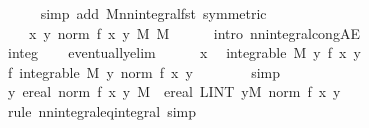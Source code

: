 \documentclass{article}
\theoremstyle{definition}
\begin{document}
\begin{figure}
\begin{isabellebody}
\ \ \ \ \isamarkupfalse%
\ {\isacharparenleft}simp\ add{\isacharcolon}\ M{}{\isachardot}nn{\isacharunderscore}integral{\isacharunderscore}fst\ {\isacharbrackleft}symmetric{\isacharbrackright}{\isacharparenright}\isanewline
\ \ \isamarkupfalse%
\ \isamarkupfalse%
\ {\isachardoublequoteopen}{\isasymdots}\ {\isacharequal}\ {\isacharparenleft}{\isasymintegral}\isactrlsup {\isacharplus}\ x{\isachardot}\ {\isasymbar}{\isasymintegral}y{\isachardot}\ norm\ {\isacharparenleft}f\ {\isacharparenleft}x{\isacharcomma}\ y{\isacharparenright}{\isacharparenright}\ {\isasympartial}M{}{\isasymbar}\ {\isasympartial}M{}{\isacharparenright}{\isachardoublequoteclose}\isanewline
\ \ \ \ \isamarkupfalse%
\ {\isacharparenleft}intro\ nn{\isacharunderscore}integral{\isacharunderscore}cong{\isacharunderscore}AE{\isacharparenright}\isanewline
\ \ \ \ \isamarkupfalse%
\ integ{}\isanewline
\ \ \isamarkupfalse%
\ eventually{\isacharunderscore}elim\isanewline
\ \ \ \ \isamarkupfalse%
\ x\ \isamarkupfalse%
\ {\isachardoublequoteopen}integrable\ M{}\ {\isacharparenleft}{\isasymlambda}y{\isachardot}\ f\ {\isacharparenleft}x{\isacharcomma}\ y{\isacharparenright}{\isacharparenright}{\isachardoublequoteclose}\isanewline
\ \ \ \ \isamarkupfalse%
\ \isamarkupfalse%
\ f{\isacharcolon}\ {\isachardoublequoteopen}integrable\ M{}\ {\isacharparenleft}{\isasymlambda}y{\isachardot}\ norm\ {\isacharparenleft}f\ {\isacharparenleft}x{\isacharcomma}\ y{\isacharparenright}{\isacharparenright}{\isacharparenright}{\isachardoublequoteclose}\isanewline
\ \ \ \ \ \ \isamarkupfalse%
\ simp\isanewline
\ \ \ \ \isamarkupfalse%
\ \isamarkupfalse%
\ {\isachardoublequoteopen}{\isacharparenleft}{\isasymintegral}\isactrlsup {\isacharplus}y{\isachardot}\ ereal\ {\isacharparenleft}norm\ {\isacharparenleft}f\ {\isacharparenleft}x{\isacharcomma}\ y{\isacharparenright}{\isacharparenright}{\isacharparenright}\ {\isasympartial}M{}{\isacharparenright}\ {\isacharequal}\ ereal\ {\isacharparenleft}LINT\ y{\isacharbar}M{}{\isachardot}\ norm\ {\isacharparenleft}f\ {\isacharparenleft}x{\isacharcomma}\ y{\isacharparenright}{\isacharparenright}{\isacharparenright}{\isachardoublequoteclose}\isanewline
\ \ \ \ \ \ \isamarkupfalse%
\ {\isacharparenleft}rule\ nn{\isacharunderscore}integral{\isacharunderscore}eq{\isacharunderscore}integral{\isacharparenright}\ simp\isanewline

\end{isabellebody}
\end{figure}
\end{document}
